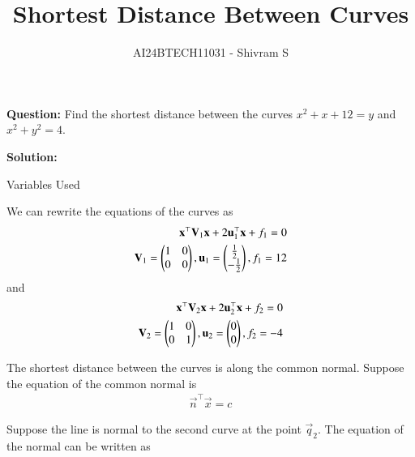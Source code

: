 \documentclass[journal]{IEEEtran}
\begin{document}
\onecolumn

\vspace{3cm}

\renewcommand{\thetable}{\theenumi}

\title{Shortest Distance Between Curves}
\author{AI24BTECH11031 - Shivram S}
\maketitle

\renewcommand{\thetable}{\theenumi} 

\setcounter{section}{1}
\textbf{Question: } Find the shortest distance between the curves $x^2 + x + 12 = y$ and $x^2 + y^2 = 4$.
\bigskip

\textbf{Solution: } 

\begin{table}[h!]    
	\centering
	
	\caption{Variables Used}
\end{table}

We can rewrite the equations of the curves as
\begin{align}
    \mathbf{x}^\top\mathbf{V}_1\mathbf{x} + 2\mathbf{u}_1^\top\mathbf{x} + f_1 = 0 \\
    \mathbf{V}_1 = \begin{pmatrix}1 & 0 \\ 0 & 0\end{pmatrix}, \mathbf{u}_1 = \begin{pmatrix}\frac{1}{2} \\ -\frac{1}{2}\end{pmatrix}, f_1 = 12
\end{align}
and 
\begin{align}
    \mathbf{x}^\top\mathbf{V}_2\mathbf{x} + 2\mathbf{u}_2^\top\mathbf{x} + f_2 = 0 \\
    \mathbf{V}_2 = \begin{pmatrix}1 & 0 \\ 0 & 1\end{pmatrix}, \mathbf{u}_2 = \begin{pmatrix}0 \\ 0\end{pmatrix}, f_2 = -4
\end{align}

The shortest distance between the curves is along the common normal. Suppose the equation of the common
normal is
\begin{align}
    \vec{n}^\top\vec{x} = c
\end{align}

Suppose the line is normal to the second curve at the point $\vec{q}_2$.
The equation of the normal can be written as
\end{document}
